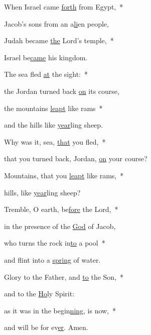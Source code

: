 \noindent When Israel came \uline{forth} from Egypt,~*~

Jacob’s sons from an a\uline{li}en people,

\noindent Judah became \uline{the} Lord’s temple,~*~

Israel be\uline{came} his kingdom.

\noindent The sea fled \uline{at} the sight:~*~

the Jordan turned back \uline{on} its course,

\noindent the mountains \uline{leapt} like rams~*~

and the hills like \uline{year}ling sheep.

\noindent Why was it, sea, \uline{that} you fled,~*~

that you turned back, Jordan, \uline{on} your course?

\noindent Mountains, that you \uline{leapt} like rams,~*~

hills, like \uline{year}ling sheep?

\noindent Tremble, O earth, be\uline{fore} the Lord,~*~

in the presence of the \uline{God} of Jacob,

\noindent who turns the rock in\uline{to} a pool~*~

and flint into a \uline{spring} of water.

\noindent Glory to the Father, and \uline{to} the Son,~*~

and to the \uline{Ho}ly Spirit:

\noindent as it was in the begin\uline{ning}, is now,~*~

and will be for ev\uline{er}. Amen.